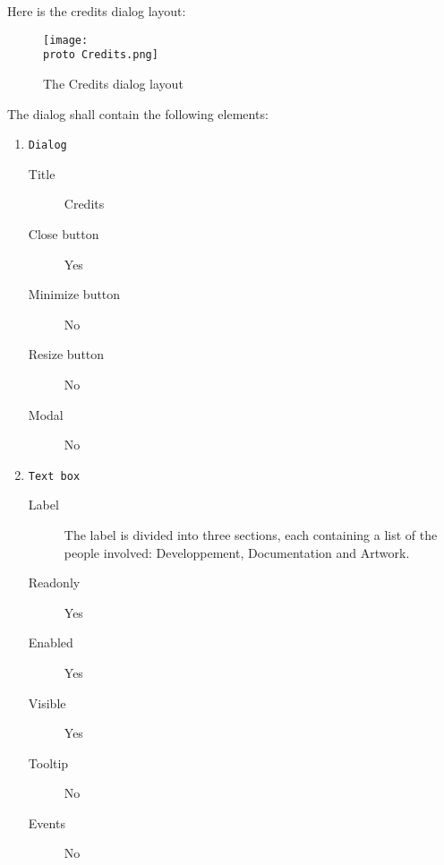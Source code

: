 Here is the credits dialog layout:

\begin{figure}[H]
  \texttt{[image: \\proto Credits.png]}
  \caption{The Credits dialog layout}
  \label{fig:CreditsDlgLayout}
\end{figure}

The dialog shall contain the following elements:

\begin{enumerate}

    \item \texttt{Dialog}
              \begin{description}
                  \item[Title] Credits
                  \item[Close button] Yes
                  \item[Minimize button] No
                  \item[Resize button] No
                  \item[Modal] No
              \end{description}

    \item \texttt{Text box}
              \begin{description}
                  \item[Label] The label is divided into three sections, each
                               containing a list of the people involved:
                               Developpement, Documentation and Artwork.
                  \item[Readonly] Yes
                  \item[Enabled] Yes
                  \item[Visible] Yes
                  \item[Tooltip] No
                  \item[Events] No
              \end{description}

\end{enumerate}

